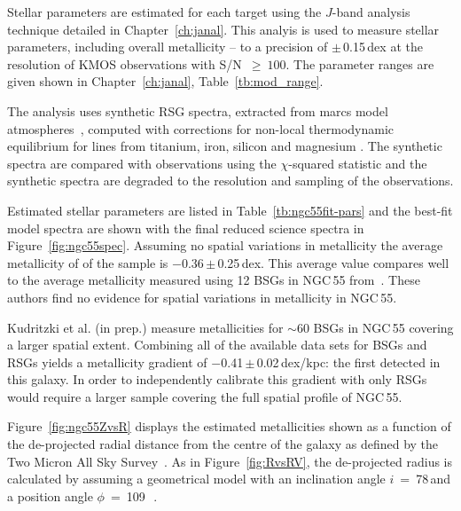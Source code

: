 Stellar parameters are estimated for each target using the $J$-band analysis technique detailed in Chapter~\ref{ch:janal}.
This analyis is used to measure stellar parameters, including overall metallicity -- to a precision of $\pm$\,0.15\,dex at the resolution of KMOS observations with S/N~$\ge~100$.
The parameter ranges are given shown in Chapter~\ref{ch:janal}, Table~\ref{tb:mod_range}.

The analysis uses synthetic RSG spectra, extracted from {\sc marcs} model atmospheres~\citep{2008A&A...486..951G},
computed with corrections for non-local thermodynamic equilibrium for lines from titanium, iron, silicon and magnesium
\citep{2012ApJ...751..156B,2013ApJ...764..115B,2015ApJ...804..113B}.
The synthetic spectra are compared with observations using the $\chi$-squared statistic and the synthetic spectra are degraded to the resolution and sampling of the observations.

Estimated stellar parameters are listed in Table~\ref{tb:ngc55fit-pars} and the best-fit model spectra are shown with the final reduced science spectra in Figure~\ref{fig:ngc55spec}.
Assuming no spatial variations in metallicity the average metallicity of of the sample is $-$0.36\,$\pm$\,0.25\,dex.
This average value compares well to the average metallicity measured using 12 BSGs in NGC\,55 from~\citep[$-$0.4\,$\pm$\,0.13]{2012A&A...542A..79C}.
These authors find no evidence for spatial variations in metallicity in NGC\,55.

Kudritzki et al. (in prep.) measure metallicities for $\sim$60 BSGs in NGC\,55 covering a larger spatial extent.
Combining all of the available data sets for BSGs and RSGs yields a metallicity gradient of $-$0.41\,$\pm$\,0.02\,dex/kpc: the first detected in this galaxy.
In order to independently calibrate this gradient with only RSGs would require a larger sample covering the full spatial profile of NGC\,55.

Figure~\ref{fig:ngc55ZvsR} displays the estimated metallicities shown as a function of the de-projected radial distance from the centre of the galaxy as defined by the Two Micron All Sky Survey~\citep[2MASS;][]{2006AJ....131.1163S}.
As in Figure~\ref{fig:RvsRV}, the de-projected radius is calculated by assuming a geometrical model with an inclination angle $i$~=~78\,\textdegree and a position angle $\phi$~=~109\,\textdegree~\citep{1991AJ....101..447P}.




